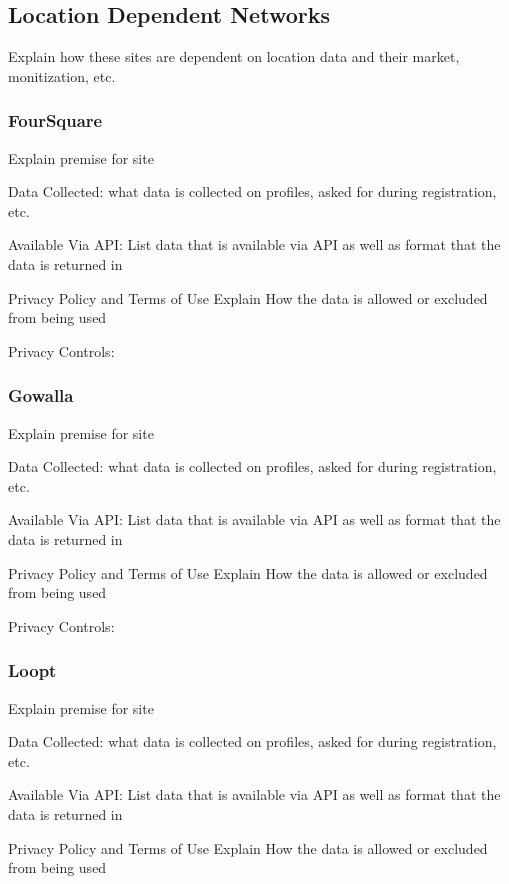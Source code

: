 \subsection{Location Dependent Networks}
Explain how these sites are dependent on location data and their market,
monitization, etc.
\subsubsection{FourSquare}
Explain premise for site

Data Collected:
what data is collected on profiles, asked for during registration, etc.

Available Via API:
List data that is available via API as well as format that the data is returned
in

Privacy Policy and Terms of Use
Explain How the data is allowed or excluded from being used

Privacy Controls:

\subsubsection{Gowalla}
Explain premise for site

Data Collected:
what data is collected on profiles, asked for during registration, etc.

Available Via API:
List data that is available via API as well as format that the data is returned
in

Privacy Policy and Terms of Use
Explain How the data is allowed or excluded from being used

Privacy Controls:

\subsubsection{Loopt}
Explain premise for site

Data Collected:
what data is collected on profiles, asked for during registration, etc.

Available Via API:
List data that is available via API as well as format that the data is returned
in

Privacy Policy and Terms of Use
Explain How the data is allowed or excluded from being used

